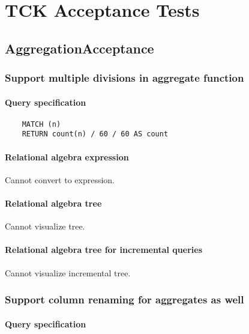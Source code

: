 \chapter{TCK Acceptance Tests}
\label{chp:acceptance-tests}


	\section{AggregationAcceptance}

	\subsection{Support multiple divisions in aggregate function}

	\subsubsection*{Query specification}

	\begin{lstlisting}
	MATCH (n)
	RETURN count(n) / 60 / 60 AS count
	\end{lstlisting}


	\subsubsection*{Relational algebra expression}

	Cannot convert to expression.

	\subsubsection*{Relational algebra tree}

	Cannot visualize tree.

	\subsubsection*{Relational algebra tree for incremental queries}

	Cannot visualize incremental tree.
	\subsection{Support column renaming for aggregates as well}

	\subsubsection*{Query specification}

